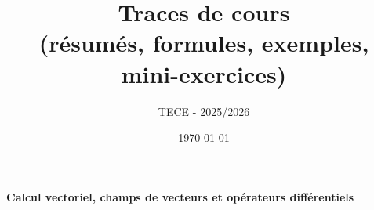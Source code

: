 \documentclass[11pt,a4paper]{report}
\title{\textbf{Traces de cours}\\\large (résumés, formules, exemples, mini-exercices)}
\author{ TECE - 2025/2026 }
\date{\today}
\begin{document}
\begin{center}
    \textbf{\Large Calcul vectoriel, champs de vecteurs et opérateurs différentiels}
\end{center}

\vspace{2em}

% 


\end{document}
